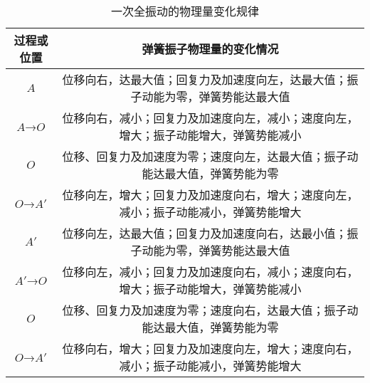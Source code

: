 \begin{table}[ht]
\centering
\caption{一次全振动的物理量变化规律}\label{HSPM09_tab1}
\begin{tabular}{|c|c|}
\hline
过程或位置 & 弹簧振子物理量的变化情况 \\
\hline
$A$ & 位移向右，达最大值；回复力及加速度向左，达最大值；振子动能为零，弹簧势能达最大值 \\
\hline
$A$→$O$ & 位移向右，减小；回复力及加速度向左，减小；速度向左，增大；振子动能增大，弹簧势能减小 \\
\hline
$O$ & 位移、回复力及加速度为零；速度向左，达最大值；振子动能达最大值，弹簧势能为零 \\
\hline
$O$→$A'$ & 位移向左，增大；回复力及加速度向右，增大；速度向左，减小；振子动能减小，弹簧势能增大 \\
\hline
$A'$ & 位移向左，达最大值；回复力及加速度向右，达最小值；振子动能为零，弹簧势能达最大值 \\
\hline
$A'$→$O$ & 位移向左，减小；回复力及加速度向右，减小；速度向右，增大；振子动能增大，弹簧势能减小 \\
\hline
$O$ & 位移、回复力及加速度为零；速度向右，达最大值；振子动能达最大值，弹簧势能为零 \\
\hline
$O$→$A'$ & 位移向右，增大；回复力及加速度向左，增大；速度向右，减小；振子动能减小，弹簧势能增大 \\
\hline
\end{tabular}
\end{table}